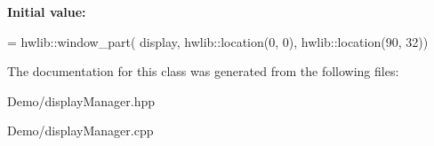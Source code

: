 {\bfseries Initial value\+:}
\begin{DoxyCode}
= hwlib::window\_part(
                                      display,
                                      hwlib::location(0, 0),
                                      hwlib::location(90, 32))
\end{DoxyCode}


The documentation for this class was generated from the following files\+:\begin{DoxyCompactItemize}
\item 
Demo/display\+Manager.\+hpp\item 
Demo/display\+Manager.\+cpp\end{DoxyCompactItemize}

